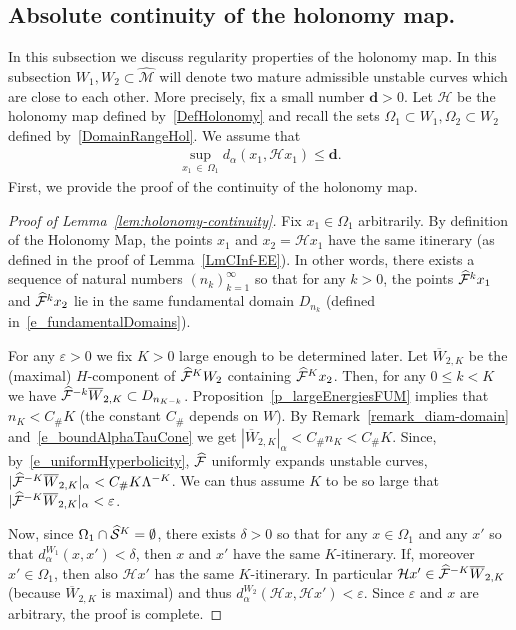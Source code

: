 \documentclass[AHL, Unicode, longabstracts,published]{cedram}
\newcommand{\eps}{\varepsilon}
\newcommand{\const}{C_\#}
\newcommand{\bd}{\mathbf{d}}
\newcommand{\cm}{\mathcal{F}}
\newcommand{\hol}{\mathcal{H}}
\newcommand{\csp}{\mathcal{M}}
\newcommand{\cmp}{\hat\cm}
\newcommand{\cspi}{\widehat{\csp}}
\newcommand{\brW}{\overline{W}}
\newcommand{\singPrivate}{\mathcal{S}}
\newcommand{\singp}[1]{\hat{\singPrivate}^{#1}}
\newcommand{\admiss}{admissible}
\newcommand{\adm}{_{\alpha^{+}}}
\newcommand{\Dom}{D}
\renewcommand{\adm}{_{\alpha}}
\let\oldhat\hat
\renewcommand*{\hat}[1]{\mathchoice{\widehat{#1}}{\widehat{#1}}{\oldhat{#1}}{\oldhat{#1}}}
\begin{document}

\subsection{Absolute continuity of the holonomy map.}\label{sec:absol-cont-holon}
In this subsection we discuss regularity properties of the holonomy map. In this subsection $W_1, W_2\subset \cspi$ will denote two mature \admiss{} unstable curves which are close to each other. More precisely, fix a small number $\bd > 0$. Let $\hol$ be the holonomy map defined by~\eqref{DefHolonomy} and recall the sets $\Omega_1\subset W_{1}, \Omega_2\subset W_{2}$ defined by~\eqref{DomainRangeHol}. We assume that
\begin{align}\label{eq:W12-closeness}
\sup_{x_{1}\,\in\,\Omega_1} d_\alpha(x_{1}, \hol x_{1})\leq \bd.
\end{align}
First, we provide the proof of the continuity of the holonomy map.

\begin{proof}[Proof of Lemma~\ref{lem:holonomy-continuity}]
Fix $x_{1}\in\Omega_{1}$ arbitrarily. By definition of the Holonomy Map, the points $x_{1}$ and $x_{2} = \hol x_{1}$ have the same itinerary (as defined in the proof of Lemma~\ref{LmCInf-EE}). In other words, there exists a sequence of natural numbers $(n_{k})_{k = 1}^{\infty}$ so that for any $k > 0$, the points $\cmp^{k}x_{1}$ and $\cmp^{k}x_{2}$ lie in the same fundamental domain $\Dom_{n_{k}}$ (defined in~\eqref{e_fundamentalDomains}).

For any $\eps > 0$ we fix $K > 0$ large enough to be determined later. Let $\brW_{2,K}$ be the (maximal) $H$-component of $\cmp^{K}W_{2}$ containing $\cmp^{K}x_{2}$. Then, for any $0\le k< K$ we have $\cmp^{-k}\brW_{2,K} \subset  \Dom_{n_{K-k}}$. Proposition~\ref{p_largeEnergiesFUM} implies that $n_{K} < \const K$ (the constant $\const$ depends on $W$). By Remark~\ref{remark_diam-domain} and~\eqref{e_boundAlphaTauCone} we get $|\brW_{2,K}|\adm  <   \const n_{K} <   \const K$. Since, by~\eqref{e_uniformHyperbolicity}, $\cmp$ uniformly expands unstable curves, $|\cmp^{-K}\brW_{2,K}|\adm < \const K\Lambda^{-K}$. We can thus assume $K$ to be so large that $|\cmp^{-K}\brW_{2,K}|\adm < \eps$.

Now, since $\Omega_{1}\cap\singp{K} = \emptyset$, there exists $\delta > 0$ so that {for any $x\in \Omega_1$} and any $x'$ so that $d\adm^{W_{1}}(x,x') < \delta$, then $x$ and $x'$ have the same $K$-itinerary. If, moreover $x'\in\Omega_{1}$, then also $\hol x'$ has the same $K$-itinerary. In particular $\hol x'\in\cmp^{-K}\brW_{2,K}$ (because $\brW_{2,K}$ is maximal) and thus $d\adm^{W_{2}}(\hol x,\hol x') < \eps$. Since $\eps$ and $x$ are arbitrary, the proof is complete.
\end{proof}
\end{document}
